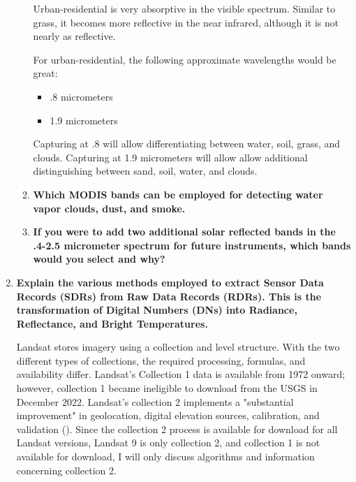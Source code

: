 \documentclass[12pt, letterpaper]{article}
\begin{document}
\begin{enumerate}
\begin{enumerate}
    Urban-residential is very absorptive in the visible spectrum. Similar to grass, it becomes more reflective in the near infrared, although it is not nearly as reflective. 

    For urban-residential, the following approximate wavelengths would be great:
    \begin{itemize}
    \item .8 micrometers
    \item 1.9 micrometers
    \end{itemize}
    Capturing at .8 will allow differentiating between water, soil, grass, and clouds. Capturing at 1.9 micrometers will allow allow additional distinguishing between sand, soil, water, and clouds.

    \item \textbf{Which MODIS bands can be employed for detecting water vapor clouds, dust, and smoke.}
    
    \item \textbf{If you were to add two additional solar reflected bands in the .4-2.5 micrometer spectrum for future instruments, which bands would you select and why?}

    \end{enumerate}

    \item \textbf{Explain the various methods employed to extract Sensor Data Records (SDRs) from Raw Data Records (RDRs). This is the transformation of Digital Numbers (DNs) into Radiance, Reflectance, and Bright Temperatures.}
    \bigskip

    Landsat stores imagery using a collection and level structure. With the two different types of collections, the required processing, formulas, and availability differ. Landsat's Collection 1 data is available from 1972 onward; however, collection 1 became ineligible to download from the USGS in December 2022. Landsat's collection 2 implements a "substantial improvement" in geolocation, digital elevation sources, calibration, and validation (\cite{usgs_landsat_collections}). Since the collection 2 process is available for download for all Landsat versions, Landsat 9 is only collection 2, and collection 1 is not available for download, I will only discuss algorithms and information concerning collection 2. 
    

\end{enumerate}
\end{document}
